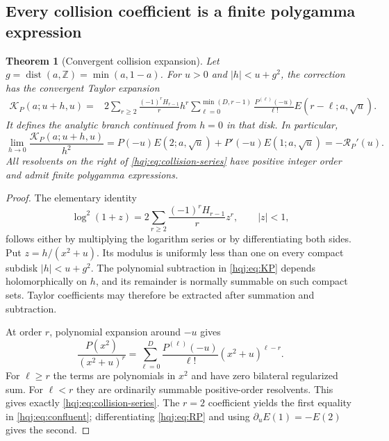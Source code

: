 \documentclass[11pt,letterpaper]{article}
\numberwithin{equation}{section}
\newtheorem{theorem}{Theorem}[section]
\theoremstyle{definition}
\newcommand{\Z}{\mathbb Z}
\begin{document}
\subsection{Every collision coefficient is a finite polygamma expression}
\begin{theorem}[Convergent collision expansion]\label{hqj:thm:collision}
Let $g=\operatorname{dist}(a,\Z)=\min(a,1-a)$. For $u>0$ and
$|h|<u+g^2$, the correction has the convergent Taylor expansion
\begin{align}
\mathcal K_P(a;u+h,u)
={}&2\sum_{r\ge2}\frac{(-1)^rH_{r-1}}r h^r
\sum_{\ell=0}^{\min(D,r-1)}
\frac{P^{(\ell)}(-u)}{\ell!}
E(r-\ell;a,\sqrt u).
\label{hqj:eq:collision-series}
\end{align}
It defines the analytic branch continued from $h=0$ in that disk.
In particular,
\begin{equation}\label{hqj:eq:confluent}
\lim_{h\to0}\frac{\mathcal K_P(a;u+h,u)}{h^2}
=P(-u)E(2;a,\sqrt u)+P'(-u)E(1;a,\sqrt u)
=-\mathcal R_P'(u).
\end{equation}
All resolvents on the right of \eqref{hqj:eq:collision-series} have
positive integer order and admit finite polygamma expressions.
\end{theorem}
\begin{proof}
The elementary identity
\[
\log^2(1+z)=2\sum_{r\ge2}\frac{(-1)^rH_{r-1}}r z^r,
\qquad |z|<1,
\]
follows either by multiplying the logarithm series or by differentiating
both sides. Put $z=h/(x^2+u)$. Its modulus is uniformly less than one
on every compact subdisk $|h|<u+g^2$. The polynomial subtraction in
\eqref{hqj:eq:KP} depends holomorphically on $h$, and its remainder is
normally summable on such compact sets. Taylor coefficients may
therefore be extracted after summation and subtraction.

At order $r$, polynomial expansion around $-u$ gives
\[
\frac{P(x^2)}{(x^2+u)^r}
=\sum_{\ell=0}^D\frac{P^{(\ell)}(-u)}{\ell!}(x^2+u)^{\ell-r}.
\]
For $\ell\ge r$ the terms are polynomials in $x^2$ and have zero
bilateral regularized sum. For $\ell<r$ they are ordinarily summable
positive-order resolvents. This gives exactly
\eqref{hqj:eq:collision-series}. The $r=2$ coefficient yields the
first equality in \eqref{hqj:eq:confluent}; differentiating
\eqref{hqj:eq:RP} and using $\partial_uE(1)=-E(2)$ gives the second.
\end{proof}
\end{document}
